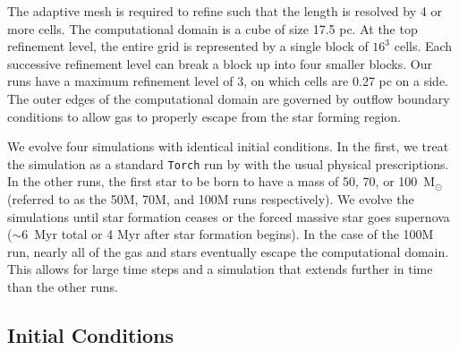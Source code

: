 \documentclass[twoside]{drexel-thesis}
\begin{document}
\begin{thesis}
The adaptive mesh is required to refine such that the \citet{truelove_jeans_1997-1} length is resolved by 4 or more cells. 
The computational domain is a cube of size 17.5 pc. At the top refinement level, the entire grid is represented by a single block of $16^3$ cells. Each successive refinement level can break a block up into four smaller blocks. Our runs have a maximum refinement level of 3, on which cells are 0.27 pc on a side. The outer edges of the computational domain are governed by outflow boundary conditions to allow gas to properly escape from the star forming region.

We evolve four simulations with identical initial conditions. In the first, we treat the simulation as a standard \texttt{Torch} run by with the usual physical prescriptions. In the other runs, the first star to be born to have a mass of 50, 70, or 100~M$_\odot$ (referred to as the 50M, 70M, and 100M runs respectively). 
We evolve the simulations until star formation ceases or the forced massive star goes supernova ($\sim6$~Myr total or 4 Myr after star formation begins). In the case of the 100M run, nearly all of the gas and stars eventually escape the computational domain. This allows for large time steps and a simulation that extends further in time than the other runs.

\subsection{Initial Conditions}


\end{thesis}
\end{document}
